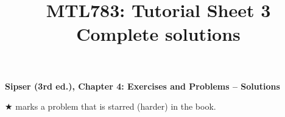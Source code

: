 \documentclass[11pt,a4paper]{article}
\title{\textbf{MTL783: Tutorial Sheet 3}\\[0.3em]\large Complete solutions}
\date{}
\begin{document}
{\centering\Large\bfseries Sipser (3rd ed.), Chapter 4: Exercises and Problems -- Solutions\par}
{\centering\small $\bigstar$ marks a problem that is starred (harder) in the book.\par}




\end{document}
